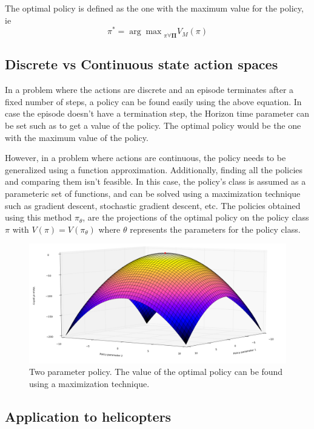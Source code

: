 \documentclass[hidelinks,BTech]{iitmdiss}
\begin{document}
The optimal policy is defined as the one with the maximum value for the policy, ie
\begin{equation}
  \pi^{*} = {\arg \max}_{\pi \forall \mathbf{\Pi}} {V_M(\pi)}
\end{equation}

\subsection*{Discrete vs Continuous state action spaces}
In a problem where the actions are discrete and an episode terminates after a fixed number of steps, a policy can be found easily using the above equation. In case the episode doesn't have a termination step, the Horizon time parameter can be set such as to get a value of the policy. The optimal policy would be the one with the maximum value of the policy.

However, in a problem where actions are continuous, the policy needs to be generalized using a function approximation. Additionally, finding all the policies and comparing them isn't feasible. In this case, the policy's class is assumed as a parameteric set of functions, and can be solved using a maximization technique such as gradient descent, stochastic gradient descent, etc. The policies obtained using this method $\pi_{\theta}$, are the projections of the optimal policy on the policy class $\pi$ with $V(\pi)=V(\pi_{\theta})$ where $\theta$ represents the parameters for the policy class.

\begin{figure}[H]
  \centering
    \includegraphics[width=\textwidth]{gradient_descent.png}
    \caption{Two parameter policy. The value of the optimal policy can be found using a maximization technique.}
\end{figure}

\subsection*{Application to helicopters}
\end{document}
